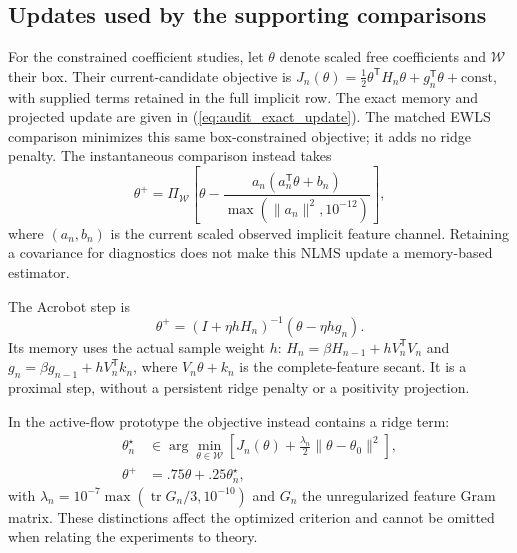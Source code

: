 \documentclass[journal]{IEEEtran}
\newcommand{\tr}{\operatorname{tr}}
\begin{document}
\subsection{Updates used by the supporting comparisons}
For the constrained coefficient studies, let $\theta$ denote scaled free
coefficients and $\mathcal W$ their box. Their current-candidate objective
is $J_n(\theta)=\tfrac12\theta^{\mathsf T}H_n\theta+g_n^{\mathsf T}\theta+
\mathrm{const}$, with supplied terms retained in the full implicit row.
The exact memory and projected update are given in
(\ref{eq:audit_exact_update}). The matched EWLS comparison minimizes this
same box-constrained objective; it adds no ridge penalty. The instantaneous
comparison instead takes
\begin{equation}
 \theta^+=\Pi_{\mathcal W}\!\left[
 \theta-\frac{a_n(a_n^{\mathsf T}\theta+b_n)}
 {\max(\|a_n\|^2,10^{-12})}\right],
 \label{eq:inventory_nlms}
\end{equation}
where $(a_n,b_n)$ is the current scaled observed implicit feature channel.
Retaining a covariance for diagnostics does not make this NLMS update a
memory-based estimator.

The Acrobot step is
\begin{equation}
 \theta^+=(I+\eta hH_n)^{-1}(\theta-\eta h g_n).
 \label{eq:inventory_proximal}
\end{equation}
Its memory uses the actual sample weight $h$:
$H_n=\beta H_{n-1}+hV_n^{\mathsf T}V_n$ and
$g_n=\beta g_{n-1}+hV_n^{\mathsf T}k_n$, where $V_n\theta+k_n$
is the complete-feature secant. It is a proximal step, without a persistent
ridge penalty or a positivity projection.

In the active-flow prototype the objective instead contains a ridge term:
\begin{align}
 \theta_n^\star&\in\arg\min_{\theta\in\mathcal W}
 \left[J_n(\theta)+\frac{\lambda_n}{2}
             \|\theta-\theta_0\|^2\right],\\
 \theta^+&=.75\theta+.25\theta_n^\star,
 \label{eq:inventory_flow_relaxation}
\end{align}
with $\lambda_n=10^{-7}\max(\tr G_n/3,10^{-10})$ and $G_n$ the
unregularized feature Gram matrix. These distinctions affect the optimized
criterion and cannot be omitted when relating the experiments to theory.
\end{document}
